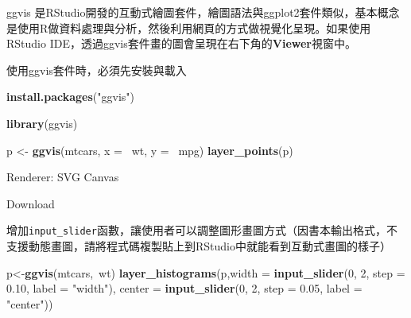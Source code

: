 \documentclass[]{book}
\newenvironment{Shaded}{\begin{snugshade}}{\end{snugshade}}
\newcommand{\KeywordTok}[1]{\textcolor[rgb]{0.13,0.29,0.53}{\textbf{{#1}}}}
\newcommand{\DataTypeTok}[1]{\textcolor[rgb]{0.13,0.29,0.53}{{#1}}}
\newcommand{\DecValTok}[1]{\textcolor[rgb]{0.00,0.00,0.81}{{#1}}}
\newcommand{\FloatTok}[1]{\textcolor[rgb]{0.00,0.00,0.81}{{#1}}}
\newcommand{\StringTok}[1]{\textcolor[rgb]{0.31,0.60,0.02}{{#1}}}
\newcommand{\NormalTok}[1]{{#1}}
\theoremstyle{definition}
\theoremstyle{definition}
\theoremstyle{remark}
\begin{document}
ggvis\citep{R-ggvis}
是RStudio開發的互動式繪圖套件，繪圖語法與ggplot2\citep{R-ggplot2}套件類似，基本概念是使用R做資料處理與分析，然後利用網頁的方式做視覺化呈現。如果使用RStudio
IDE，透過ggvis套件畫的圖會呈現在右下角的\textbf{Viewer}視窗中。

使用ggvis套件時，必須先安裝與載入

\begin{Shaded}
\begin{Highlighting}[]
\KeywordTok{install.packages}\NormalTok{(}\StringTok{"ggvis"}\NormalTok{)}
\end{Highlighting}
\end{Shaded}

\begin{Shaded}
\begin{Highlighting}[]
\KeywordTok{library}\NormalTok{(ggvis)}
\end{Highlighting}
\end{Shaded}

\begin{Shaded}
\begin{Highlighting}[]
\NormalTok{p <-}\StringTok{ }\KeywordTok{ggvis}\NormalTok{(mtcars, }\DataTypeTok{x =} \NormalTok{~wt, }\DataTypeTok{y =} \NormalTok{~mpg)}
\KeywordTok{layer_points}\NormalTok{(p)}
\end{Highlighting}
\end{Shaded}

\hypertarget{plot_id578777234-container}{}
\hypertarget{plot_id578777234}{}

Renderer: SVG \textbar{} Canvas

Download

增加\texttt{input\_slider}函數，讓使用者可以調整圖形畫圖方式（因書本輸出格式，不支援動態畫圖，請將程式碼複製貼上到RStudio中就能看到互動式畫圖的樣子）

\begin{Shaded}
\begin{Highlighting}[]
\NormalTok{p<-}\KeywordTok{ggvis}\NormalTok{(mtcars,~wt)}
\KeywordTok{layer_histograms}\NormalTok{(p,}\DataTypeTok{width =}  \KeywordTok{input_slider}\NormalTok{(}\DecValTok{0}\NormalTok{, }\DecValTok{2}\NormalTok{, }\DataTypeTok{step =} \FloatTok{0.10}\NormalTok{, }\DataTypeTok{label =} \StringTok{"width"}\NormalTok{),}
                   \DataTypeTok{center =} \KeywordTok{input_slider}\NormalTok{(}\DecValTok{0}\NormalTok{, }\DecValTok{2}\NormalTok{, }\DataTypeTok{step =} \FloatTok{0.05}\NormalTok{, }\DataTypeTok{label =} \StringTok{"center"}\NormalTok{))}
\end{Highlighting}
\end{Shaded}
\end{document}
